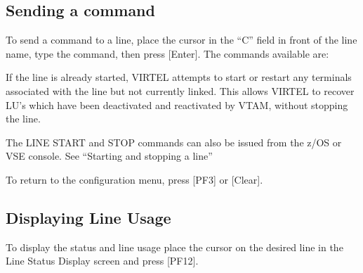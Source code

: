 \documentclass[letterpaper,10pt,english]{sphinxmanual}
\begin{document}
\ignorespaces 

\subsection{Sending a command}
\label{\detokenize{audit_operations_ and_performance:sending-a-command}}\label{\detokenize{audit_operations_ and_performance:index-38}}
\sphinxAtStartPar
To send a command to a line, place the cursor in the “C” field in front of the line name, type the command, then press {[}Enter{]}. The  commands available are:
\begin{description}
\begin{description}
\sphinxAtStartPar
If the line is already started, VIRTEL attempts to start or restart any terminals associated with the line but not currently linked. This allows VIRTEL to recover LU’s which have been     deactivated and reactivated by VTAM, without stopping the line.

\end{description}

\begin{description}
\sphinxAtStartPar
The LINE START and STOP commands can also be issued from the z/OS or VSE console. See “Starting and stopping a line”

\end{description}

\end{description}

\sphinxAtStartPar
To return to the configuration menu, press {[}PF3{]} or {[}Clear{]}.

\ignorespaces 

\subsection{Displaying Line Usage}
\label{\detokenize{audit_operations_ and_performance:displaying-line-usage}}\label{\detokenize{audit_operations_ and_performance:index-39}}
\sphinxAtStartPar
To display the status and line usage place the cursor on the desired line in the Line Status Display screen and press {[}PF12{]}.
\end{document}
